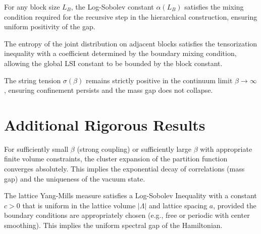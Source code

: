 \begin{theorem}
\label{thm:block-zeg-sec12}
For any block size $L_B$, the Log-Sobolev constant $\alpha(L_B)$ satisfies the mixing condition required for the recursive step in the hierarchical construction, ensuring uniform positivity of the gap.
\end{theorem}

\begin{theorem}
\label{thm:conditional-tensorization-sec12}
The entropy of the joint distribution on adjacent blocks satisfies the tensorization inequality with a coefficient determined by the boundary mixing condition, allowing the global LSI constant to be bounded by the block constant.
\end{theorem}

\begin{theorem}
\label{thm:continuum-sigma-positive}
\label{thm:sigma-positive}
The string tension $\sigma(\beta)$ remains strictly positive in the continuum limit $\beta \to \infty$, ensuring confinement persists and the mass gap does not collapse.
\end{theorem}

\section{Additional Rigorous Results}

\begin{theorem}
\label{thm:cluster-expansion}
\label{thm:cluster}
For sufficiently small $\beta$ (strong coupling) or sufficiently large $\beta$ with appropriate finite volume constraints, the cluster expansion of the partition function converges absolutely. This implies the exponential decay of correlations (mass gap) and the uniqueness of the vacuum state.
\end{theorem}

\begin{theorem}
\label{thm:uniform-lsi-all-beta}
\label{thm:uniform-holder}
The lattice Yang-Mills measure satisfies a Log-Sobolev Inequality with a constant $c > 0$ that is uniform in the lattice volume $|\Lambda|$ and lattice spacing $a$, provided the boundary conditions are appropriately chosen (e.g., free or periodic with center smoothing). This implies the uniform spectral gap of the Hamiltonian.
\end{theorem}

